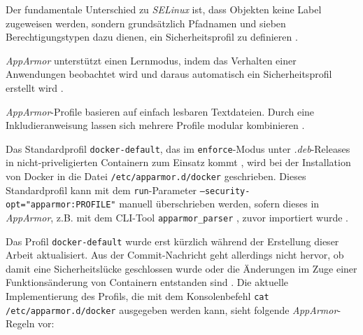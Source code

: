 \documentclass[../main.tex]{subfiles}
\begin{document}
				Der fundamentale Unterschied zu \emph{SELinux} ist, dass Objekten keine Label zugeweisen werden, sondern grundsätzlich Pfadnamen und sieben Berechtigungstypen dazu dienen, ein Sicherheitsprofil zu definieren \cite{linuxSecOverview}\cite{apparmorQuickProfileLanguage}.


				\emph{AppArmor} unterstützt einen Lernmodus, indem das Verhalten einer Anwendungen beobachtet wird und daraus automatisch ein Sicherheitsprofil erstellt wird \cite{linuxSecOverview}.

				\emph{AppArmor}-Profile basieren auf einfach lesbaren Textdateien. Durch eine Inkludieranweisung lassen sich mehrere Profile modular kombinieren \cite{apparmorQuickProfileLanguage}.

				Das Standardprofil \texttt{docker-default}\cite{githubAppArmorProfileContainer}, das im \texttt{enforce}-Modus unter \emph{.deb}-Releases in nicht-priveligierten Containern zum Einsatz kommt \cite{docker110Security}, wird bei der Installation von Docker in die Datei \texttt{/etc/apparmor.d/docker} geschrieben. Dieses Standardprofil kann mit dem \texttt{run}-Parameter \texttt{--security-opt="apparmor:PROFILE"} manuell überschrieben werden, sofern dieses in \emph{AppArmor}, z.B. mit dem \acrshort{CLI}-Tool \texttt{apparmor\_parser} \cite{apparmorParser}, zuvor importiert wurde \cite{dockerRun}.

				Das Profil \texttt{docker-default} wurde erst kürzlich während der Erstellung dieser Arbeit aktualisiert. Aus der Commit-Nachricht geht allerdings nicht hervor, ob damit eine Sicherheitslücke geschlossen wurde oder die Änderungen im Zuge einer Funktionsänderung von Containern entstanden sind \cite{githubAppArmorProfileContainerFix}. Die aktuelle Implementierung des Profils, die mit dem Konsolenbefehl \texttt{cat /etc/apparmor.d/docker} ausgegeben werden kann, sieht folgende \emph{AppArmor}-Regeln vor:
\end{document}
